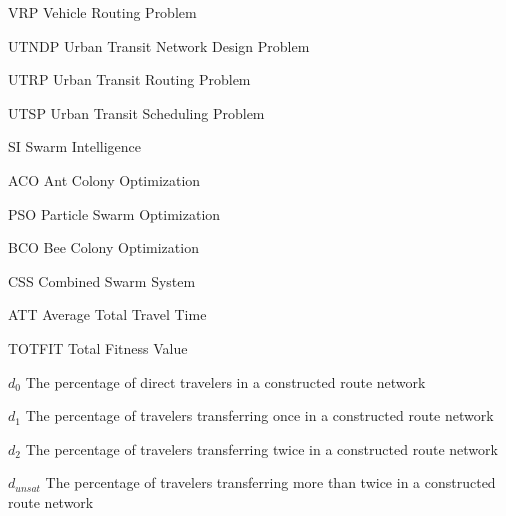 \begin{abbrv}
\item[VRP] Vehicle Routing Problem
\item[UTNDP] Urban Transit Network Design Problem
\item[UTRP] Urban Transit Routing Problem
\item[UTSP] Urban Transit Scheduling Problem
\item[SI] Swarm Intelligence
\item[ACO] Ant Colony Optimization
\item[PSO] Particle Swarm Optimization
\item[BCO] Bee Colony Optimization
\item[CSS] Combined Swarm System
\item[ATT] Average Total Travel Time
\item[TOTFIT] Total Fitness Value
\item[$d_0$] The percentage of direct travelers in a constructed route network
\item[$d_1$] The percentage of travelers transferring once in a constructed route network
\item[$d_2$] The percentage of travelers transferring twice in a constructed route network
\item[$d_{unsat}$] The percentage of travelers transferring more than twice in a constructed route network

\end{abbrv}
 
 

 
 
 
 
